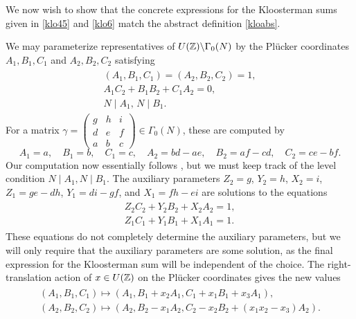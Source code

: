 \documentclass[11pt]{amsart}
\theoremstyle{plain}
\numberwithin{equation}{section}
\theoremstyle{definition}
\begin{document}
We now wish to show that the concrete expressions for the Kloosterman sums given in \eqref{klo45} and \eqref{klo6} match the abstract definition \eqref{kloabs}.

We may parameterize representatives of $U(\Bbb{Z})\backslash\Gamma_0(N)$ by the Pl\"ucker coordinates $A_1,B_1,C_1$ and $A_2,B_2,C_2$ satisfying
\begin{align}
\label{eq:PlukerConds}
\begin{array}{l}
	(A_1,B_1,C_1)=(A_2,B_2,C_2)=1, \\
	A_1 C_2+B_1B_2+C_1 A_2=0, \\
	N\mid A_1,\,  N\mid B_1.
\end{array}
\end{align}
For a matrix $\gamma = \left(\begin{smallmatrix}g&h&i\\d&e&f\\a&b&c\end{smallmatrix}\right)\in \Gamma_0(N)$, these are computed by
\[ A_1=a, \quad B_1=b, \quad C_1=c, \quad A_2=bd-ae, \quad B_2=af-cd, \quad C_2=ce-bf. \]
Our computation now essentially follows \cite{BFG}, but we must keep track of the level condition $N\mid A_1, N\mid B_1$.
The auxiliary parameters $Z_2=g$, $Y_2=h$, $X_2=i$, $Z_1=ge-dh$, $Y_1=di-gf$, and $X_1=fh-ei$ are solutions to the equations
\begin{align}
\label{eq:AuxPluker}
\begin{array}{l}
	Z_2 C_2+Y_2 B_2+X_2 A_2=1, \\
	Z_1 C_1+Y_1 B_1+X_1 A_1=1.
\end{array}
\end{align}
These equations do not completely determine the auxiliary parameters, but we will only require that the auxiliary parameters are some solution, as the final expression for the Kloosterman sum will be independent of the choice. 
The right-translation action of $x \in U(\Bbb{Z})$ on the Pl\"ucker coordinates gives the new values
\begin{align*}
\begin{array}{l}
(A_1, B_1,C_1) \mapsto (A_1, B_1+x_2 A_1,C_1+x_1 B_1+x_3 A_1), \\
(A_2, B_2, C_2) \mapsto (A_2, B_2 - x_1 A_2, C_2 - x_2 B_2 + (x_1 x_2-x_3) A_2).
\end{array}
\end{align*}
\end{document}
